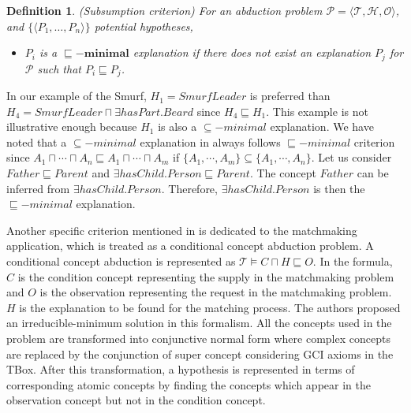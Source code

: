 \documentclass{article}
\newtheorem{mydef}{Definition}
\begin{document}
 \begin{mydef}{(Subsumption criterion)}
For an abduction problem $\mathcal{P}=\langle \mathcal{T},\mathcal{H}, \mathcal{O}\rangle$, and $\{\langle P_{1},\dots,P_{n}\rangle\}$ potential hypotheses,
\begin{itemize}
\item  $P_{i}$ is a $\bm{\sqsubseteq -minimal}$ explanation if there does not exist an explanation $P_{j}$ for $\mathcal{P}$ such that $P_{i}\sqsubseteq P_{j}$.
\end{itemize}
\end{mydef}
In our example of the Smurf, $H_1=SmurfLeader$ is preferred than $H_4=SmurfLeader\sqcap \exists hasPart.Beard$ since $H_4\sqsubseteq H_1$.
This example is not illustrative enough because $H_1$ is also a $\subseteq-minimal$ explanation.
We have noted that a $\subseteq-minimal$ explanation in \cite{bienvenu08complexity} always follows $\sqsubseteq-minimal$ criterion since 
$A_1\sqcap \cdots\sqcap A_n\sqsubseteq A_1\sqcap \cdots\sqcap A_m$ if $\{A_1, \cdots, A_m\}\subseteq \{A_1, \cdots, A_n\}$.
Let us consider $Father \sqsubseteq Parent$ and $\exists hasChild.Person \sqsubseteq Parent$. The concept $Father$ can be inferred from $\exists hasChild.Person$.
Therefore, $\exists hasChild.Person$ is then the $\sqsubseteq-minimal$ explanation. 


Another specific criterion mentioned in \cite{di2007semantic} is dedicated to the matchmaking application, which is treated as a conditional concept abduction problem.
A conditional concept abduction is represented as $\mathcal{T}\vDash C\sqcap H\sqsubseteq O$. 
In the formula, $C$ is the condition concept representing the supply in the matchmaking problem and $O$ is the observation representing the request in the matchmaking problem.
$H$ is the explanation to be found for the matching process.
The authors proposed an irreducible-minimum solution in this formalism.
All the concepts used in the problem are transformed into conjunctive normal form where complex concepts are replaced by the conjunction of super concept considering GCI axioms in the TBox.
After this transformation, a hypothesis is represented in terms of corresponding atomic concepts by finding the concepts which appear in the observation concept but not in the condition concept.
\end{document}
